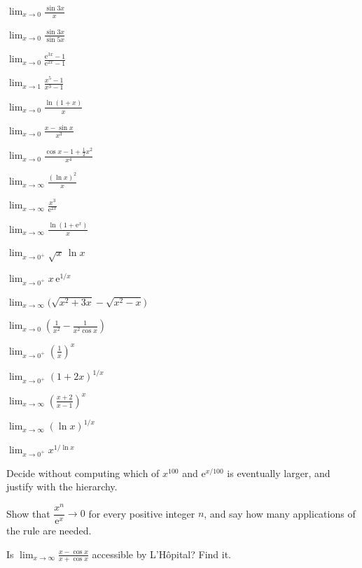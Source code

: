 \begin{problems}
  \item $\displaystyle\lim_{x\to0}\frac{\sin 3x}{x}$
  \item $\displaystyle\lim_{x\to0}\frac{\sin 3x}{\sin 5x}$
  \item $\displaystyle\lim_{x\to0}\frac{\mathrm{e}^{3x}-1}{\mathrm{e}^{2x}-1}$
  \item $\displaystyle\lim_{x\to1}\frac{x^{5}-1}{x^{3}-1}$
  \item $\displaystyle\lim_{x\to0}\frac{\ln(1+x)}{x}$
  \item $\displaystyle\lim_{x\to0}\frac{x-\sin x}{x^{3}}$
  \item $\displaystyle\lim_{x\to0}\frac{\cos x-1+\tfrac12x^{2}}{x^{4}}$
  \item $\displaystyle\lim_{x\to\infty}\frac{(\ln x)^{2}}{x}$
  \item $\displaystyle\lim_{x\to\infty}\frac{x^{3}}{\mathrm{e}^{2x}}$
  \item $\displaystyle\lim_{x\to\infty}
        \frac{\ln(1+\mathrm{e}^{x})}{x}$
  \item $\displaystyle\lim_{x\to0^{+}}\sqrt{x}\,\ln x$
  \item $\displaystyle\lim_{x\to0^{+}}x\,\mathrm{e}^{1/x}$
  \item $\displaystyle\lim_{x\to\infty}
        \bigl(\sqrt{x^{2}+3x}-\sqrt{x^{2}-x}\bigr)$
  \item $\displaystyle\lim_{x\to0}
        \left(\frac{1}{x^{2}}-\frac{1}{x^{2}\cos x}\right)$
  \item $\displaystyle\lim_{x\to0^{+}}\left(\frac{1}{x}\right)^{x}$
  \item $\displaystyle\lim_{x\to0^{+}}(1+2x)^{1/x}$
  \item $\displaystyle\lim_{x\to\infty}
        \left(\frac{x+2}{x-1}\right)^{x}$
  \item $\displaystyle\lim_{x\to\infty}(\ln x)^{1/x}$
  \item $\displaystyle\lim_{x\to0^{+}}x^{1/\ln x}$
  \item Decide without computing which of $x^{100}$ and
        $\mathrm{e}^{x/100}$ is eventually larger, and justify with the
        hierarchy.
  \item Show that $\dfrac{x^{n}}{\mathrm{e}^{x}}\to0$ for every positive
        integer $n$, and say how many applications of the rule are needed.
  \item Is $\displaystyle\lim_{x\to\infty}
        \frac{x-\cos x}{x+\cos x}$ accessible by L'H\^opital? Find it.

\end{problems}
